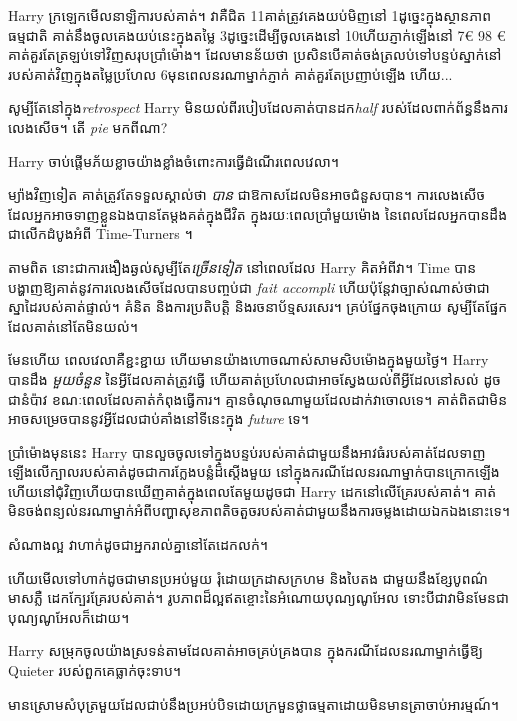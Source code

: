 {{Harry ក្រឡេកមើលនាឡិការបស់គាត់។ វាគឺជិត 11\am គាត់ត្រូវគេងយប់មិញនៅ 1\am ដូច្នេះក្នុងស្ថានភាពធម្មជាតិ គាត់នឹងចូលគេងយប់នេះក្នុងតម្លៃ 3\am ដូច្នេះដើម្បីចូលគេងនៅ 10\pm ហើយភ្ញាក់ឡើងនៅ 7€ 98 € គាត់គួរតែត្រឡប់ទៅវិញសរុបប្រាំម៉ោង។ ដែលមានន័យថា ប្រសិនបើគាត់ចង់ត្រលប់ទៅបន្ទប់ស្នាក់នៅរបស់គាត់វិញក្នុងតម្លៃប្រហែល 6\am មុនពេលនរណាម្នាក់ភ្ញាក់ គាត់គួរតែប្រញាប់ឡើង ហើយ...

សូម្បីតែនៅក្នុង\emph{retrospect} Harry មិនយល់ពីរបៀបដែលគាត់បានដក\emph{half} របស់ដែលពាក់ព័ន្ធនឹងការលេងសើច។ តើ \emph{pie} មកពីណា?

Harry ចាប់ផ្តើមភ័យខ្លាចយ៉ាងខ្លាំងចំពោះការធ្វើដំណើរពេលវេលា។

ម្យ៉ាងវិញទៀត គាត់ត្រូវតែទទួលស្គាល់ថា \emph{បាន} ជាឱកាសដែលមិនអាចជំនួសបាន។ ការលេងសើច ដែលអ្នកអាចទាញខ្លួនឯងបានតែម្តងគត់ក្នុងជីវិត ក្នុងរយៈពេលប្រាំមួយម៉ោង នៃពេលដែលអ្នកបានដឹងជាលើកដំបូងអំពី Time-Turners ។

តាមពិត នោះជាការងឿងឆ្ងល់សូម្បីតែ\emph{ច្រើនទៀត} នៅពេលដែល Harry គិតអំពីវា។ Time បានបង្ហាញឱ្យគាត់នូវការលេងសើចដែលបានបញ្ចប់ជា \emph{fait accompli} ហើយប៉ុន្តែវាច្បាស់ណាស់ថាជាស្នាដៃរបស់គាត់ផ្ទាល់។ គំនិត និងការប្រតិបត្តិ និងរចនាប័ទ្មសរសេរ។ គ្រប់ផ្នែកចុងក្រោយ សូម្បីតែផ្នែកដែលគាត់នៅតែមិនយល់។

មែនហើយ ពេលវេលាគឺខ្ជះខ្ជាយ ហើយមានយ៉ាងហោចណាស់សាមសិបម៉ោងក្នុងមួយថ្ងៃ។ Harry បានដឹង \emph{មួយចំនួន} នៃអ្វីដែលគាត់ត្រូវធ្វើ ហើយគាត់ប្រហែលជាអាចស្វែងយល់ពីអ្វីដែលនៅសល់ ដូចជានំប៉ាវ ខណៈពេលដែលគាត់កំពុងធ្វើការ។ គ្មាន​ចំណុច​ណា​មួយ​ដែល​ដាក់​វា​ចោល​ទេ។ គាត់ពិតជាមិនអាចសម្រេចបាននូវអ្វីដែលជាប់គាំងនៅទីនេះក្នុង \emph{future} ទេ។

\later

ប្រាំម៉ោងមុននេះ Harry បានលួចចូលទៅក្នុងបន្ទប់របស់គាត់ជាមួយនឹងអាវធំរបស់គាត់ដែលទាញឡើងលើក្បាលរបស់គាត់ដូចជាការក្លែងបន្លំដ៏ស្តើងមួយ នៅក្នុងករណីដែលនរណាម្នាក់បានក្រោកឡើងហើយនៅជុំវិញហើយបានឃើញគាត់ក្នុងពេលតែមួយដូចជា Harry ដេកនៅលើគ្រែរបស់គាត់។ គាត់​មិន​ចង់​ពន្យល់​នរណា​ម្នាក់​អំពី​បញ្ហា​សុខភាព​តិចតួច​របស់​គាត់​ជាមួយ​នឹង​ការ​ចម្លង​ដោយ​ឯកឯង​នោះ​ទេ។

សំណាង​ល្អ វា​ហាក់​ដូច​ជា​អ្នក​រាល់​គ្នា​នៅ​តែ​ដេក​លក់។

ហើយមើលទៅហាក់ដូចជាមានប្រអប់មួយ រុំដោយក្រដាសក្រហម និងបៃតង ជាមួយនឹងខ្សែបូពណ៌មាសភ្លឺ ដេកក្បែរគ្រែរបស់គាត់។ រូបភាពដ៏ល្អឥតខ្ចោះនៃអំណោយបុណ្យណូអែល ទោះបីជាវាមិនមែនជាបុណ្យណូអែលក៏ដោយ។

Harry សម្រុកចូលយ៉ាងស្រទន់តាមដែលគាត់អាចគ្រប់គ្រងបាន ក្នុងករណីដែលនរណាម្នាក់ធ្វើឱ្យ Quieter របស់ពួកគេធ្លាក់ចុះទាប។

មាន​ស្រោម​សំបុត្រ​មួយ​ដែល​ជាប់​នឹង​ប្រអប់​បិទ​ដោយ​ក្រមួន​ថ្លា​ធម្មតា​ដោយ​មិន​មាន​ត្រា​ចាប់​អារម្មណ៍។

}}
